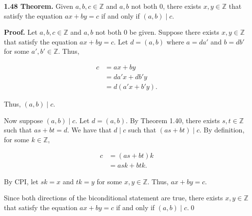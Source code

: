 \documentclass[12pt]{article}
\begin{document}
\noindent\textbf{1.48 Theorem.} Given $a,b,c\in\mathbb{Z}$ and $a,b$ not both 0, there exists $x,y\in\mathbb{Z}$ that satisfy the equation $ax+by=c$ if and only if $(a,b)\mid c$.

\bigskip

\noindent\textbf{Proof.} Let $a,b,c\in\mathbb{Z}$ and $a,b$ not both 0 be given. Suppose there exists $x,y\in\mathbb{Z}$ that satisfy the equation $ax+by=c$. Let $d=(a,b)$ where $a=da'$ and $b=db'$ for some $a',b'\in\mathbb{Z}$. Thus,

\begin{align*}
c &= ax + by \\
&= da'x + db'y\\
&= d(a'x + b'y).
\end{align*}

\noindent Thus, $(a,b)\mid c$.

\bigskip

\noindent Now suppose $(a,b)\mid c$. Let $d=(a,b)$. By Theorem 1.40, there exists $s,t\in\mathbb{Z}$ such that $as+bt=d$. We have that $d\mid c$ such that $(as+bt)\mid c$. By definition, for some $k\in\mathbb{Z}$,

\begin{align*}
c &= (as + bt)k \\
&= ask + btk.
\end{align*}

\noindent By CPI, let $sk=x$ and $tk=y$ for some $x,y\in\mathbb{Z}$. Thus, $ax+by=c$.

\bigskip

\noindent Since both directions of the biconditional statement are true, there exists $x,y\in\mathbb{Z}$ that satisfy the equation $ax+by=c$ if and only if $(a,b)\mid c$.\qed
\end{document}
